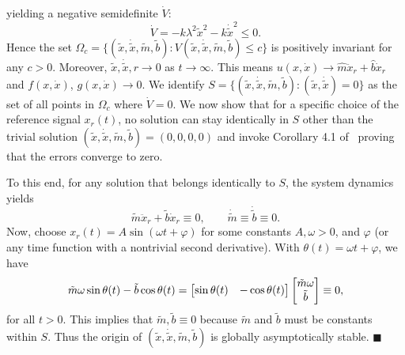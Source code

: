 yielding a
negative semidefinite $\dot{V}$:
\[\dot{V} = -k\lambda^2\tilde{x}^2 - k\dot{\tilde{x}}^2 \leq 0. \]
%
Hence the set $\Omega_c = \{(\tilde{x}, \dot{\tilde{x}}, \tilde{m}, \tilde{b}):
V(\tilde{x}, \dot{\tilde{x}}, \tilde{m}, \tilde{b}) \leq c \}$ is positively
invariant for any $c > 0$. Moreover, $\tilde{x}, \dot{\tilde{x}}, r \rightarrow
0$ as $t \rightarrow \infty$. This means $u(x, \dot{x}) \rightarrow
\hat{m}\ddot{x}_r + \hat{b}\dot{x}_r$ and $f(x, \dot{x})$, $g(x, \dot{x})
\rightarrow 0$. We identify $S = \{(\tilde{x}, \dot{\tilde{x}}, \tilde{m},
\tilde{b}): (\tilde{x}, \dot{\tilde{x}}) = 0\}$ as the set of all points in
$\Omega_c$ where $\dot{V} = 0$. We now show that for a specific choice of the
reference signal $x_r(t)$, no solution can stay identically in $S$ other than
the trivial solution $(\tilde{x}, \dot{\tilde{x}}, \tilde{m}, \tilde{b}) =
(0,0,0,0)$ and invoke Corollary 4.1 of~\cite{khalil2015nonlinear} proving that
the errors converge to zero.

To this end, for any solution that belongs identically to $S$, the system
dynamics yields \[ \tilde{m}\ddot{x}_r + \tilde{b}\dot{x}_r \equiv 0, \qquad
\dot{\tilde{m}} \equiv \dot{\tilde{b}} \equiv 0. \] Now,
choose $\boxed{x_r(t) = A\sin{(\omega t + \varphi)}}$ for some constants $A,
\omega > 0$, and $\varphi$ (or any time function with a nontrivial second
derivative). With $\theta(t) = \omega t + \varphi$, we have \[
\tilde{m}\omega\sin{\theta(t)} - \tilde{b}\cos{\theta(t)} =
\begin{bmatrix}\sin{\theta(t)} & -\cos{\theta(t)}\end{bmatrix}\begin{bmatrix}\tilde{m}\omega \\ \tilde{b}\end{bmatrix}
\equiv 0, \] for all $t > 0$. This implies that $\tilde{m}, \tilde{b} \equiv 0$
because $\tilde{m}$ and $\tilde{b}$ must be constants within $S$. Thus the
origin of $(\tilde{x}, \dot{\tilde{x}}, \tilde{m}, \tilde{b})$ is globally
asymptotically stable. \hfill $\blacksquare$
